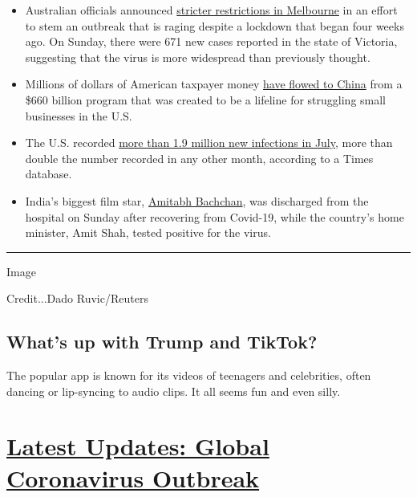 \begin{itemize}
\item
  Australian officials announced
  \href{https://www.nytimes.com/2020/08/02/world/coronavirus-covid-19.html?action=click\&module=Top\%20Stories\&pgtype=Homepage\#link-74f9a2b2}{stricter
  restrictions in Melbourne} in an effort to stem an outbreak that is
  raging despite a lockdown that began four weeks ago. On Sunday, there
  were 671 new cases reported in the state of Victoria, suggesting that
  the virus is more widespread than previously thought.
\item
  Millions of dollars of American taxpayer money
  \href{https://www.nytimes.com/2020/08/02/us/politics/virus-china-ppp-small-business-loans.html?action=click\&module=Top\%20Stories\&pgtype=Homepage}{have
  flowed to China} from a \$660 billion program that was created to be a
  lifeline for struggling small businesses in the U.S.
\item
  The U.S. recorded
  \href{https://www.nytimes.com/2020/08/02/world/coronavirus-covid-19.html}{more
  than 1.9 million new infections in July,} more than double the number
  recorded in any other month, according to a Times database.
\item
  India's biggest film star,
  \href{https://www.nytimes.com/2020/08/02/world/coronavirus-covid-19.html\#link-144c443a}{Amitabh
  Bachchan}, was discharged from the hospital on Sunday after recovering
  from Covid-19, while the country's home minister, Amit Shah, tested
  positive for the virus.
\end{itemize}

\begin{center}\rule{0.5\linewidth}{\linethickness}\end{center}

Image

Credit...Dado Ruvic/Reuters

\hypertarget{whats-up-with-trump-and-tiktok}{%
\subsection{What's up with Trump and
TikTok?}\label{whats-up-with-trump-and-tiktok}}

The popular app is known for its videos of teenagers and celebrities,
often dancing or lip-syncing to audio clips. It all seems fun and even
silly.

\hypertarget{latest-updates-global-coronavirus-outbreak}{%
\section{\texorpdfstring{\href{https://www.nytimes.com/2020/08/01/world/coronavirus-covid-19.html?action=click\&pgtype=Article\&state=default\&region=MAIN_CONTENT_1\&context=storylines_live_updates}{Latest
Updates: Global Coronavirus
Outbreak}}{Latest Updates: Global Coronavirus Outbreak}}\label{latest-updates-global-coronavirus-outbreak}}

